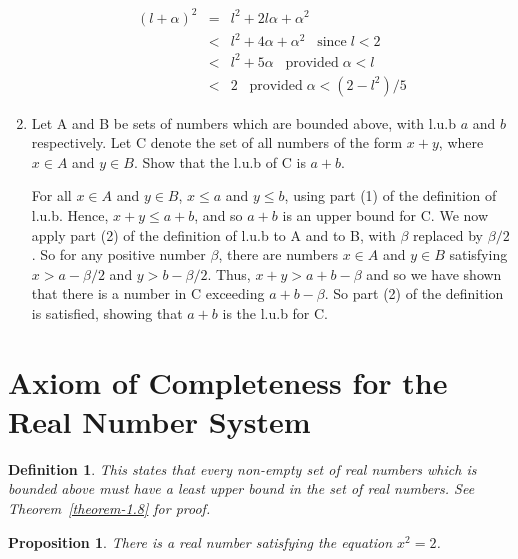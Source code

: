 \documentclass[12pt]{scrbook}
\newtheorem*{definition}{Definition}
\newtheorem{proposition}{Proposition}[section]
\begin{document}
\begin{enumerate}
	\begin{eqnarray*}
	(l + \alpha)^2 	&=& l^2 + 2 l \alpha  + \alpha^2 \\
				&<& l^2 + 4 \alpha + \alpha^2 \;\;\; \text{since} \; l < 2 \\
				&<&  l^2 + 5 \alpha \;\;\; \text{provided} \; \alpha < l \\
				&<&  2 \;\;\;  \text{provided} \; \alpha < (2 - l^2)/5
	\end{eqnarray*}
	
	
	\item Let A and B be sets of numbers which are bounded above, with l.u.b $a$ and $b$ respectively.  Let C denote the set of all numbers of the form $x + y$, where $x \in A$ and $y \in B$.  Show that the l.u.b of C is $a + b$.
	
	For all $x \in A$ and $y \in B$, $x \leq a$ and $y \leq b$, using part (1) of the definition of l.u.b.  Hence, $x + y \leq a + b$, and so $a + b$ is an upper bound for C.  We now apply part (2) of the definition of l.u.b to A and to B, with $\beta$ replaced by $\beta/2$.  So for any positive number $\beta$, there are numbers $x \in A$ and $y \in B$ satisfying $x > a - \beta/2$ and $y > b - \beta/2$.  Thus, $ x + y > a + b - \beta $ and so we have shown that there is a number in C exceeding $ a + b - \beta $.  So part (2) of the definition is satisfied, showing that $a + b$ is the l.u.b for C.
	
\end{enumerate}

\section{Axiom of Completeness for the Real Number System}

\begin{definition}
	This states that every non-empty set of real numbers which is bounded above must have a least upper bound in the set of real numbers.  See Theorem~\ref{theorem-1.8} for proof.
\end{definition}

\begin{proposition}
\label{prop-sqrt-two}
There is a real number satisfying the equation $x^2 = 2$.
\end{proposition}
\end{document}
